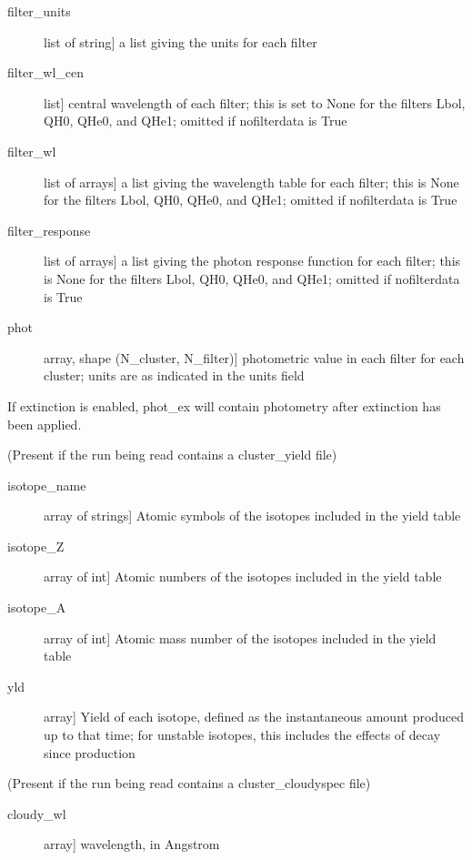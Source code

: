 \documentclass[letterpaper,10pt,english]{sphinxmanual}
\begin{document}
\begin{fulllineitems}
\begin{description}
\begin{description}
\item[{filter\_units}] \leavevmode{[}list of string{]}
a list giving the units for each filter

\item[{filter\_wl\_cen}] \leavevmode{[}list{]}
central wavelength of each filter; this is set to None for the
filters Lbol, QH0, QHe0, and QHe1; omitted if nofilterdata is
True

\item[{filter\_wl}] \leavevmode{[}list of arrays{]}
a list giving the wavelength table for each filter; this is
None for the filters Lbol, QH0, QHe0, and QHe1; omitted if
nofilterdata is True

\item[{filter\_response}] \leavevmode{[}list of arrays{]}
a list giving the photon response function for each filter;
this is None for the filters Lbol, QH0, QHe0, and QHe1; omitted
if nofilterdata is True

\item[{phot}] \leavevmode{[}array, shape (N\_cluster, N\_filter){]}
photometric value in each filter for each cluster; units are as
indicated in the units field

\end{description}

If extinction is enabled, phot\_ex will contain photometry  
after extinction has been applied.

(Present if the run being read contains a cluster\_yield file)
\begin{description}
\item[{isotope\_name}] \leavevmode{[}array of strings{]}
Atomic symbols of the isotopes included in the yield table

\item[{isotope\_Z}] \leavevmode{[}array of int{]}
Atomic numbers of the isotopes included in the yield table

\item[{isotope\_A}] \leavevmode{[}array of int{]}
Atomic mass number of the isotopes included in the yield table

\item[{yld}] \leavevmode{[}array{]}
Yield of each isotope, defined as the instantaneous amount
produced up to that time; for unstable isotopes, this
includes the effects of decay since production

\end{description}

(Present if the run being read contains a cluster\_cloudyspec file)
\begin{description}
\item[{cloudy\_wl}] \leavevmode{[}array{]}
wavelength, in Angstrom


\end{description}
\end{description}
\end{fulllineitems}
\end{document}
